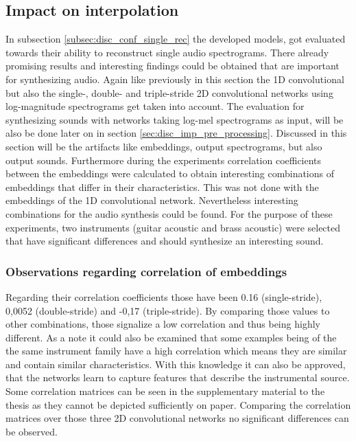 \subsection{Impact on interpolation}
\label{subsec:disc_conf_inter}
In subsection \ref{subsec:disc_conf_single_rec} the developed models, got evaluated towards their ability to reconstruct single audio spectrograms. There already promising results and interesting findings could be obtained that are important for synthesizing audio. Again like previously in this section the 1D convolutional but also the single-, double- and triple-stride 2D convolutional networks using log-magnitude spectrograms get taken into account. The evaluation for synthesizing sounds with networks taking log-mel spectrograms as input, will be also be done later on in section \ref{sec:disc_imp_pre_processing}. Discussed in this section will be the artifacts like embeddings, output spectrograms, but also output sounds. Furthermore during the experiments correlation coefficients between the embeddings were calculated to obtain interesting combinations of embeddings that differ in their characteristics. This was not done with the embeddings of the 1D convolutional network. Nevertheless interesting combinations for the audio synthesis could be found. For the purpose of these experiments, two instruments (guitar acoustic and brass acoustic) were selected that have significant differences and should synthesize an interesting sound. 

\subsubsection{Observations regarding correlation of embeddings}
Regarding their correlation coefficients those have been 0.16 (single-stride), 0,0052 (double-stride) and -0,17 (triple-stride). By comparing those values to other combinations, those signalize a low correlation and thus being highly different. As a note it could also be examined that some examples being of the the same instrument family have a high correlation which means they are similar and contain similar characteristics. With this knowledge it can also be approved, that the networks learn to capture features that describe the instrumental source. Some correlation matrices can be seen in the supplementary material to the thesis as they cannot be depicted sufficiently on paper. Comparing the correlation matrices over those three 2D convolutional networks no significant differences can be observed.

